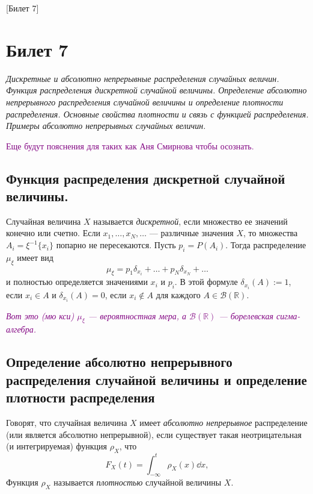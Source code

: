 [Билет 7]

\section{Билет 7}

\begin{center}
    \it Дискретные и абсолютно непрерывные распределения случайных величин.
    Функция распределения дискретной случайной величины.
    Определение абсолютно непрерывного распределения случайной величины и определение плотности распределения.
    Основные свойства плотности и связь с функцией распределения.
    Примеры абсолютно непрерывных случайных величин.

    \textcolor{purple}{Еще будут пояснения для таких как Аня Смирнова чтобы осознать.}
\end{center}

\sectionbreak
\subsection{Функция распределения дискретной случайной величины.}

\begin{definition}
    Случайная величина $X$ называется {\it дискретной}, если множество ее значений конечно или счетно.
    Если $x_1, \ldots, x_N, \ldots$ --- различные значения $X$, то множества $A_i = \xi^{-1} \{ x_i \}$ попарно не пересекаются.
    Пусть $p_i = P(A_i)$.
    Тогда распределение $\mu_{\xi}$ имеет вид
    \[
        \mu_{\xi} = p_1 \delta_{x_i} + \ldots + p_N \delta_{x_N} + \ldots
    \]
    и полностью определяется значениями $x_i$ и $p_i$.
    В этой формуле $\delta_{x_i}(A) := 1$, если $x_i \in A$ и $\delta_{x_i}(A) = 0$, если $x_i \notin A$ для каждого $A\in \mathcal{B}(\mathbb{R})$.
\end{definition}

\textcolor{purple}{\it Вот это (мю кси) $\mu_{\xi}$ --- вероятностная мера, а $\mathcal{B}(\mathbb{R})$ --- борелевская сигма-алгебра.}

\sectionbreak
\subsection{Определение абсолютно непрерывного распределения случайной величины и определение плотности распределения}

\begin{definition}
    Говорят, что случайная величина $X$ имеет {\it абсолютно непрерывное} распределение (или является абсолютно непрерывной), если существует такая неотрицательная (и интегрируемая) функция $\rho_X$, что
    \[
        F_X(t) = \int_{-\infty}^t \rho_X(x) \dd x,
    \]
    Функция $\rho_X$ называется {\it плотностью} случайной величины $X$.
\end{definition}

